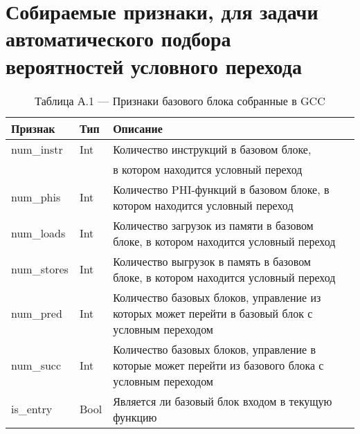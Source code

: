 \chapter{Собираемые признаки, для задачи автоматического подбора вероятностей условного перехода} \label{app:A}
\begin{table} [htbp]
	\raggedright
	
	\begin{threeparttable}%
		\caption*{Таблица А.1 --- Признаки базового блока собранные в GCC}\label{op:pgo_geatures1}%
		\begin{tabular}{| m{3cm} | m{1cm} |  m{9cm}l |}
			\hline
			\hline
			\centering \textbf{Признак}			 & \centering  \textbf{Тип} &  \centering  \textbf{Описание} & \\
			\hline
			\centering num\_instr			 & \centering  Int & Количество инструкций в базовом блоке, & \\
			&                 & в котором находится условный переход & \\
			\hline
			\centering num\_phis			 & \centering  Int &    Количество PHI-функций в базовом блоке, в котором находится условный переход & \\
			\hline
			\centering num\_loads			 & \centering  Int &    Количество загрузок из памяти в базовом блоке, в котором находится условный переход & \\
			\hline
			\centering num\_stores			 & \centering  Int &    Количество выгрузок в память в базовом блоке, в котором находится условный переход & \\
			\hline
			\centering num\_pred			 & \centering  Int &    Количество базовых блоков, управление из которых может перейти в базовый блок с условным переходом & \\
			\hline
			\centering num\_succ			 & \centering  Int &    Количество базовых блоков, управление в которые может перейти из базового блока с условным переходом & \\
			\hline
			\centering is\_entry			 & \centering  Bool &   Является ли базовый блок входом в текущую  функцию & \\
			\hline
			\hline
		\end{tabular}
	\end{threeparttable}
\end{table}


